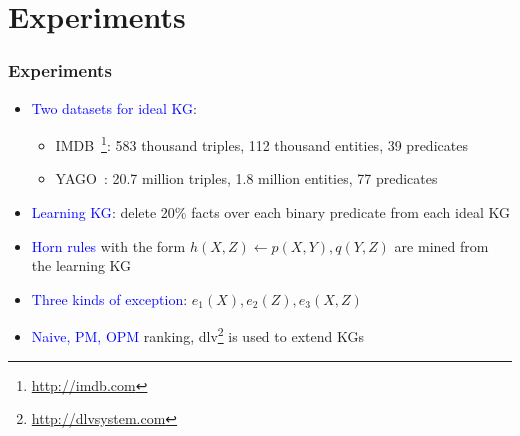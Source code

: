 \documentclass{beamer}
\newcommand{\bl}[1]{\textcolor{blue}{#1}}
\newcommand{\mi}[1]{\ensuremath{\mathit{#1}}}
\begin{document}
\section{Experiments}
\begin{frame}\frametitle{Experiments}
\begin{itemize}
\item \bl{Two datasets for ideal KG}:
\begin{itemize}
\item IMDB~\footnote{\url{http://imdb.com}}: 583 thousand triples, 112 thousand entities, 39 predicates
\item YAGO~\cite{yago}: 20.7 million triples, 1.8 million entities, 77 predicates
\end{itemize}

\medskip

\item \bl{Learning KG}: delete 20\% facts over each binary predicate from each ideal KG
\medskip

\item \bl{Horn rules} with the form $\mi{h(X,Z)\leftarrow p(X,Y),q(Y,Z)}$ are mined from the learning KG
\medskip

\item \bl{Three kinds of exception}: $\mi{e_1(X),e_2(Z),e_3(X,Z)}$
\medskip

\item \bl{Naive, PM, OPM} ranking, dlv\footnote{\url{http://dlvsystem.com}} is used to extend KGs
\end{itemize}

\end{frame}
\end{document}
